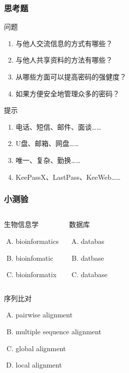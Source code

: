 \begin{frame}
  \frametitle{思考题}
  \begin{block}{问题}
  \begin{enumerate}[<+-|alert@+>]
    \item 与他人交流信息的方式有哪些？
    \item 与他人共享资料的方法有哪些？
    \item 从哪些方面可以提高密码的强健度？
    \item 如果方便安全地管理众多的密码？
  \end{enumerate}
  \end{block}
  \pause
  \begin{block}{提示}
    \begin{enumerate}
      \item 电话、短信、邮件、面谈……
      \item U盘、邮箱、网盘……
      \item 唯一、复杂、勤换……
      \item KeePassX、LastPass、KeeWeb……
    \end{enumerate}
  \end{block}
\end{frame}

\begin{frame}
  \frametitle{小测验}
  \begin{columns}
    \begin{block}{生物信息学}
      \begin{enumerate}[(A)]
        \item bioinformatics
        \item bioinfomatic
        \item bioinformatix
      \end{enumerate}
    \end{block}
    \pause
    \begin{block}{数据库}
      \begin{enumerate}[(A)]
        \item databas
        \item datbase
        \item database
      \end{enumerate}
    \end{block}
  \end{columns}
  \pause
  \begin{columns}
    \begin{block}{序列比对}
      \begin{enumerate}[(A)]
        \item pairwise alignment
        \item multiple sequence alignment
        \item global alignment
        \item local alignment
      \end{enumerate}
    \end{block}
  \end{columns}
\end{frame}
